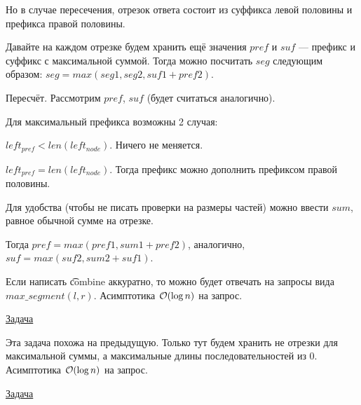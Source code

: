 Но в случае пересечения, отрезок ответа состоит из суффикса левой половины и префикса правой половины. 
\down

Давайте на каждом отрезке будем хранить ещё значения $pref$ и $suf$ --- префикс и суффикс с максимальной суммой. Тогда можно посчитать $seg$ следующим образом: $seg=max(seg1,seg2,suf1+pref2)$.

\begin{center}
	\begin{figure}[h]
	\end{figure}
\end{center}

Пересчёт. Рассмотрим $pref$, $suf$ (будет считаться аналогично).

Для максимальный префикса возможны 2 случая:

\up \up
\begin{MyList}[0pt]
	\item $left_{pref} < len(left_{node})$. Ничего не меняется.
	\item $left_{pref} = len(left_{node})$. Тогда префикс можно дополнить префиксом правой половины.
\end{MyList}
\up \up

Для удобства (чтобы не писать проверки на размеры частей) можно ввести $sum$, равное обычной сумме на отрезке.

Тогда $pref=max(pref1,sum1+pref2)$, аналогично, $suf=max(suf2,sum2+suf1)$.

Если написать \t{combine} аккуратно, то можно будет отвечать на запросы вида $max\_segment(l, r)$. Асимптотика $\mathcal{O}(\log n)$ на запрос.

 \href{https://informatics.mccme.ru/mod/statements/view3.php?chapterid=111798}{Задача}

Эта задача похожа на предыдущую. Только тут будем хранить не отрезки для максимальной суммы, а максимальные длины последовательностей из 0. Асимптотика $\mathcal{O}(\log n)$ на запрос.


 \href{https://codeforces.com/edu/course/2/lesson/4/2/practice/contest/273278/problem/B}{Задача}

